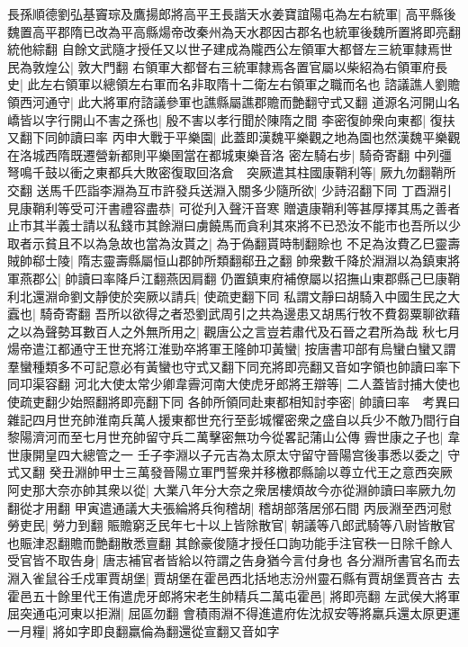 長孫順德劉弘基竇琮及鷹揚郎將高平王長諧天水姜寶誼陽屯為左右統軍|{
	高平縣後魏置高平郡隋已改為平高縣煬帝改秦州為天水郡因古郡名也統軍後魏所置將即亮翻統他綜翻}
自餘文武隨才授任又以世子建成為隴西公左領軍大都督左三統軍隸焉世民為敦煌公|{
	敦大門翻}
右領軍大都督右三統軍隸焉各置官屬以柴紹為右領軍府長史|{
	此左右領軍以總領左右軍而名非取隋十二衛左右領軍之職而名也}
諮議譙人劉贍領西河通守|{
	此大將軍府諮議參軍也譙縣屬譙郡贍而艶翻守式又翻}
道源名河開山名嶠皆以字行開山不害之孫也|{
	殷不害以孝行聞於陳隋之間}
李密復帥衆向東都|{
	復扶又翻下同帥讀曰率}
丙申大戰于平樂園|{
	此蓋即漢魏平樂觀之地為園也然漢魏平樂觀在洛城西隋既遷營新都則平樂圉當在都城東樂音洛}
密左騎右步|{
	騎奇寄翻}
中列彊弩鳴千鼓以衝之東都兵大敗密復取回洛倉　突厥遣其柱國康鞘利等|{
	厥九勿翻鞘所交翻}
送馬千匹詣李淵為互市許發兵送淵入關多少隨所欲|{
	少詩沼翻下同}
丁酉淵引見康鞘利等受可汗書禮容盡恭|{
	可從刋入聲汗音寒}
贈遺康鞘利等甚厚擇其馬之善者止市其半義士請以私錢市其餘淵曰虜饒馬而貪利其來將不已恐汝不能市也吾所以少取者示貧且不以為急故也當為汝貰之|{
	為于偽翻貰時制翻賒也}
不足為汝費乙巳靈壽賊帥郗士陵|{
	隋志靈壽縣屬恒山郡帥所類翻郗丑之翻}
帥衆數千降於淵淵以為鎮東將軍燕郡公|{
	帥讀曰率降戶江翻燕因肩翻}
仍置鎮東府補僚屬以招撫山東郡縣己巳康鞘利北還淵命劉文靜使於突厥以請兵|{
	使疏吏翻下同}
私謂文靜曰胡騎入中國生民之大蠧也|{
	騎奇寄翻}
吾所以欲得之者恐劉武周引之共為邊患又胡馬行牧不費芻粟聊欲藉之以為聲勢耳數百人之外無所用之|{
	觀唐公之言豈若肅代及石晉之君所為哉}
秋七月煬帝遣江都通守王世充將江淮勁卒將軍王隆帥卭黃蠻|{
	按唐書卭部有烏蠻白蠻又謂羣蠻種類多不可記意必有黃蠻也守式又翻下同充將即亮翻又音如字領也帥讀曰率下同卭渠容翻}
河北大使太常少卿韋霽河南大使虎牙郎將王辯等|{
	二人蓋皆討捕大使也使疏吏翻少始照翻將即亮翻下同}
各帥所領同赴東都相知討李密|{
	帥讀曰率　考異曰雜記四月世充帥淮南兵萬人援東都世充行至彭城懼密衆之盛自以兵少不敵乃間行自黎陽濟河而至七月世充帥留守兵二萬擊密無功今從畧記蒲山公傳}
霽世康之子也|{
	韋世康開皇四大總管之一}
壬子李淵以子元吉為太原太守留守晉陽宫後事悉以委之|{
	守式又翻}
癸丑淵帥甲士三萬發晉陽立軍門誓衆并移檄郡縣諭以尊立代王之意西突厥阿史那大奈亦帥其衆以從|{
	大業八年分大奈之衆居樓煩故今亦從淵帥讀曰率厥九勿翻從才用翻}
甲寅遣通議大夫張綸將兵徇稽胡|{
	稽胡部落居邠石間}
丙辰淵至西河慰勞吏民|{
	勞力到翻}
賑贍窮乏民年七十以上皆除散官|{
	朝議等八郎武騎等八尉皆散官也賑津忍翻贍而艶翻散悉亶翻}
其餘豪俊隨才授任口詢功能手注官秩一日除千餘人受官皆不取告身|{
	唐志補官者皆給以符謂之告身猶今言付身也}
各分淵所書官名而去淵入雀鼠谷壬戍軍賈胡堡|{
	賈胡堡在霍邑西北括地志汾州靈石縣有賈胡堡賈咅古}
去霍邑五十餘里代王侑遣虎牙郎將宋老生帥精兵二萬屯霍邑|{
	將即亮翻}
左武侯大將軍屈突通屯河東以拒淵|{
	屈區勿翻}
會積雨淵不得進遣府佐沈叔安等將羸兵還太原更運一月糧|{
	將如字即良翻羸倫為翻還從宣翻又音如字}
